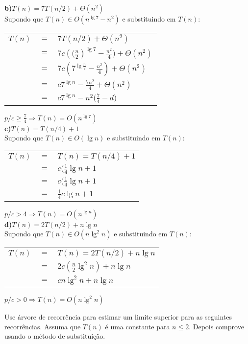 \documentclass[a4paper]{exam}
\begin{document}
\begin{questions}
\begin{solution}
    \textbf{b)$T(n) = 7T(n/2) + \Theta(n^2)$}\\

    Supondo que $T(n) \in O(n^{\lg 7} - n^2)$ e substituindo em $T(n):$\\
    \begin{tabular}{lll}
      $T(n) $& $=$ &$ 7T(n/2) + \Theta(n^2)$ \\
      {}& $=$ &$ 7c({(\frac{n}{2}})^{\lg 7} - \frac{n^2}{4}) + \Theta(n^2)$\\
      {}& $=$ &$ 7c({7^{\lg \frac{n}{2}} - \frac{n^2}{4}}) + \Theta(n^2)$\\
      {}& $=$ &$ c{7^{\lg n} - \frac{7n^2}{4}} + \Theta(n^2)$\\
      {}& $=$ &$ c{7^{\lg n} - n^2(\frac{7}{4}} - d)$\\
    \end{tabular}

    $p/ c \geq \frac{7}{4} \Rightarrow T(n) = O(n^{\lg 7})$\\

    \textbf{c)$T(n) = T(n/4) + 1$}\\

    Supondo que $T(n) \in O(\lg n)$ e substituindo em $T(n):$\\
    \begin{tabular}{lll}
      $T(n) $& $=$ &$ T(n) = T(n/4) + 1$ \\
      {}& $=$ &$ c(\frac{1}{4} {\lg n} + 1$\\
      {}& $=$ &$ c(\frac{1}{4} {\lg n} + 1$\\
      {}& $=$ &$ \frac{1}{4}c{\lg n} + 1$\\
    \end{tabular}

    $p/ c > 4 \Rightarrow T(n) = O(n^{\lg n})$\\

    \textbf{d)$T(n) = 2T(n/2) + n\lg n$}\\

    Supondo que $T(n) \in O(n\lg^2 n)$ e substituindo em $T(n):$\\
    \begin{tabular}{lll}
      $T(n) $& $=$ &$ T(n) = 2T(n/2) + n\lg n$ \\
      {}& $=$ &$ 2c(\frac{n}{2} \lg^2 n) + n\lg n$\\
      {}& $=$ &$ cn\lg^2 n + n\lg n$\\
    \end{tabular}

    $p/ c > 0 \Rightarrow T(n) = O(n\lg^2 n)$\\    
  \end{solution}
  \question Use árvore de recorrência para estimar um limite superior
  para as seguintes recorrências. Assuma que $T(n)$ é uma constante
  para $n \leq 2$. Depois comprove usando o método de
  substituição.
  \begin{parts}

\end{parts}
\end{questions}
\end{document}
